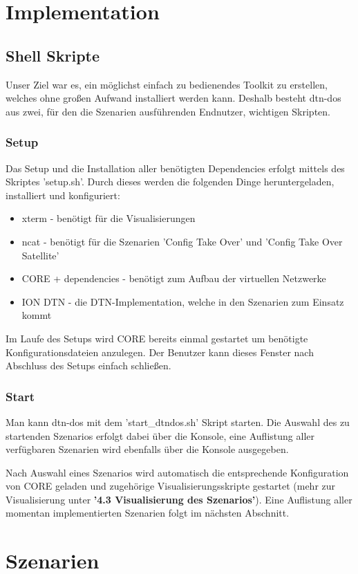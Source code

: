 \documentclass{article}
\begin{document}
\section{Implementation}
\subsection{Shell Skripte}
Unser Ziel war es, ein möglichst einfach zu bedienendes Toolkit zu erstellen, welches ohne großen Aufwand installiert werden kann. Deshalb besteht dtn-dos aus zwei, für den die Szenarien ausführenden Endnutzer, wichtigen Skripten.
\subsubsection{Setup}
Das Setup und die Installation aller benötigten Dependencies erfolgt mittels des Skriptes 'setup.sh'. Durch dieses werden die folgenden Dinge heruntergeladen, installiert und konfiguriert:
\begin{itemize}
    \item xterm - benötigt für die Visualisierungen
    \item ncat - benötigt für die Szenarien 'Config Take Over' und 'Config Take Over Satellite'
    \item CORE + dependencies - benötigt zum Aufbau der virtuellen Netzwerke
    \item ION DTN - die DTN-Implementation, welche in den Szenarien zum Einsatz kommt
\end{itemize}
Im Laufe des Setups wird CORE bereits einmal gestartet um benötigte Konfigurationsdateien anzulegen. Der Benutzer kann dieses Fenster nach Abschluss des Setups einfach schließen. 
\subsubsection{Start}
Man kann dtn-dos mit dem 'start\_dtndos.sh' Skript starten. Die Auswahl des zu startenden Szenarios erfolgt dabei über die Konsole, eine Auflistung aller verfügbaren Szenarien wird ebenfalls über die Konsole ausgegeben.\par
Nach Auswahl eines Szenarios wird automatisch die entsprechende Konfiguration von CORE geladen und zugehörige Visualisierungsskripte gestartet (mehr zur Visualisierung unter \textbf{'4.3 Visualisierung des Szenarios'}). Eine Auflistung aller momentan implementierten Szenarien folgt im nächsten Abschnitt.
\section{Szenarien}
\end{document}

